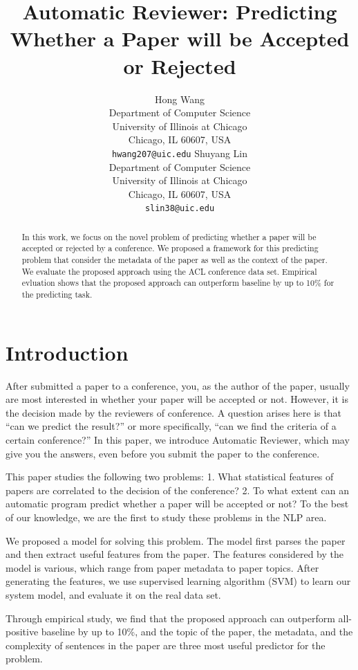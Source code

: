 \documentclass[11pt,letterpaper]{article}
\title{Automatic Reviewer: Predicting Whether a Paper will be Accepted or Rejected}
\author{Hong Wang\\
	    Department of Computer Science\\
	    University of Illinois at Chicago\\
	    Chicago, IL 60607, USA\\
	    {\tt hwang207@uic.edu}
	  \And
	Shuyang Lin\\
  	 Department of Computer Science\\
	    University of Illinois at Chicago\\
	    Chicago, IL 60607, USA\\
	  {\tt slin38@uic.edu}}
\date{}
\begin{document}
\maketitle
\begin{abstract}
In this work, we focus on the novel problem of predicting whether a paper will be accepted or rejected by a conference.
We proposed a framework for this predicting problem that consider the metadata of the paper as well as the context of the paper.
We evaluate the proposed approach using the ACL conference data set.
Empirical evluation shows that the proposed approach can outperform baseline by up to 10\% for the predicting task.

\end{abstract}

\section{Introduction}
After submitted a paper to a conference, you, as the author of the paper, usually are most interested in whether your paper will be accepted or not. However, it is the decision made by the reviewers of conference. A question arises here is that “can we predict the result?” or more specifically, “can we find the criteria of a certain conference?” In this paper, we introduce Automatic Reviewer, which may give you the answers, even before you submit the paper to the conference. 

This paper studies the following two problems: 1. What statistical features of papers are correlated to the decision of the conference? 2. To what extent can an automatic program predict whether a paper will be accepted or not?
To the best of our knowledge, we are the first to study these problems in the NLP area.

We proposed a model for solving this problem.
The model first parses the paper and then extract useful features from the paper.
The features considered by the model is various, which range from paper metadata to paper topics. 
After generating the features, 
we use supervised learning algorithm (SVM) to learn our system model, 
and evaluate it on the real data set.

Through empirical study, 
we find that the proposed approach can outperform all-positive baseline by up to 10\%,
and the topic of the paper, the metadata, and the complexity of sentences in the paper are three most useful predictor for the problem.
\end{document}

